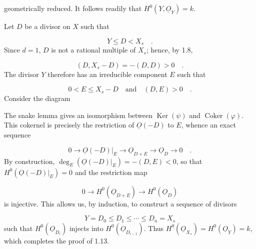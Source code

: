 
geometrically reduced.  It follows readily that
$H^0(Y,\underline{O}_Y)=k$.

Let $D$ be a divisor on $X$ such that

\begin{equation*}
Y\leq D<X_s \quad .
\end{equation*}
Since $d=1$, $D$ is not a rational multiple of $X_s$; hence, by 1.8,

\begin{equation*}
(D,X_s-D)=-(D,D)>0 \quad .
\end{equation*}
The divisor $Y$ therefore has an irreducible component $E$ such that

\begin{equation*}
0<E\leq X_s-D \quad\text{and}\quad (D,E)>0 \quad .
\end{equation*}
Consider the diagram

\begin{center}
\end{center}
The snake lemma gives an isomorphism between $\operatorname{Ker}(\psi)$ and
$\operatorname{Coker}(\varphi)$.  This cokernel is precisely the restriction of
$\underline{O}(-D)$ to $E$, whence an exact sequence

\begin{equation*}
0\longrightarrow\underline{O}(-D)|_E
\longrightarrow\underline{O}_{D+E}
\longrightarrow\underline{O}_D\longrightarrow0 \quad .
\end{equation*}
By construction,
$\deg_E(\underline{O}(-D)|_E)=-(D,E)<0$, so that
$H^0(\underline{O}(-D)|_E)=0$ and the restriction map

\begin{equation*}
0\longrightarrow H^0(\underline{O}_{D+E})
\longrightarrow H^0(\underline{O}_D)
\end{equation*}
is injective.  This allows us, by induction, to construct a sequence of divisors

\begin{equation*}
Y=D_0\leq D_1\leq\cdots\leq D_n=X_s
\end{equation*}
such that $H^0(\underline{O}_{D_i})$ injects into
$H^0(\underline{O}_{D_{i-1}})$.  Thus
$H^0(\underline{O}_{X_s})=H^0(\underline{O}_Y)=k$, which completes the proof of
1.13.

